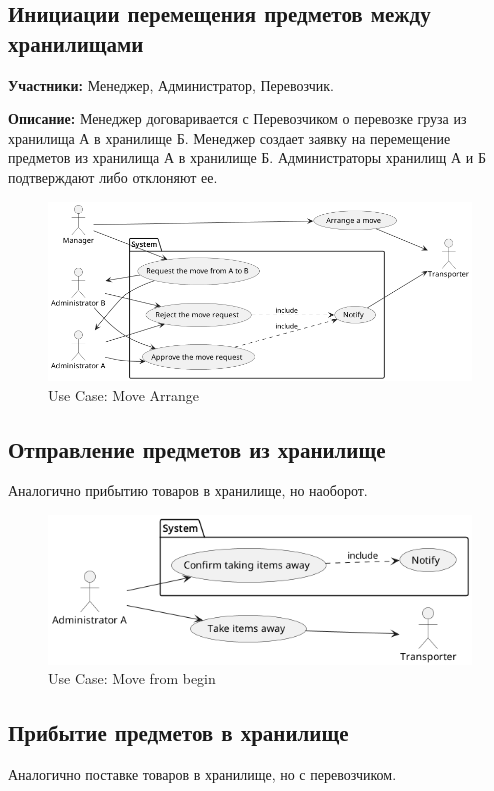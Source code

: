 
\subsection{Инициации перемещения предметов между хранилищами}

\textbf{Участники:}
Менеджер, Администратор, Перевозчик.

\textbf{Описание:}
Менеджер договаривается с Перевозчиком о перевозке груза из 
хранилища А в хранилище Б. Менеджер создает заявку на перемещение
предметов из хранилища А в хранилище Б. Администраторы хранилищ 
А и Б подтверждают либо отклоняют ее.

\begin{figure}[h]
  \centering
  \includegraphics[width=12cm]{../../doc/spec/figure/usecase/move_arrange/Storage Net, Use Case, Move Arrange.png}
  \caption{Use Case: Move Arrange}
\end{figure}

\subsection{Отправление предметов из хранилище}
Аналогично прибытию товаров в хранилище, но наоборот.

\begin{figure}[h]
  \centering
  \includegraphics[width=12cm]{../../doc/spec/figure/usecase/move_from_confirm/Storage Net, Use Case, Move from begin.png}
  \caption{Use Case: Move from begin}
\end{figure}

\subsection{Прибытие предметов в хранилище}
Аналогично поставке товаров в хранилище, но с перевозчиком.
